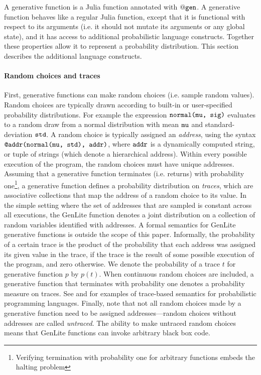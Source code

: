 A generative function is a Julia function annotated with $\mathtt{@gen}{}$.
A generative function behaves like a regular Julia function, except that it is functional with respect to its arguments (i.e. it should not mutate its arguments or any global state), and it has access to additional probabilistic language constructs.
Together these properties allow it to represent a probability distribution.
This section describes the additional language constructs.

\paragraph{Random choices and traces}
First, generative functions can make random choices (i.e. sample random values).
Random choices are typically drawn according to built-in or user-specified probability distributions.
For example the expression $\mbox{\texttt{normal(mu, sig)}}$ evaluates to a random draw from a normal distribution with mean $\mbox{\texttt{mu}}$ and standard-deviation $\mbox{\texttt{std}}$.
A random choice is typically assigned an \emph{address}, using the syntax $\mbox{\texttt{@addr(normal(mu, std), addr)}}$, where $\mbox{\texttt{addr}}$ is a dynamically computed string, or tuple of strings (which denote a hierarchical address).
Within every possible execution of the program, the random choices must have unique addresses.
Assuming that a generative function terminates (i.e. returns) with probability one\footnote{Verifying termination with probability one for arbitrary functions embeds the halting problem}, a generative function defines a probability distribution on \emph{traces}, which are associative collections that map the address of a random choice to its value.
In the simple setting where the set of addresses that are sampled is constant across all executions, the GenLite function denotes a joint distribution on a collection of random variables identified with addresses.
A formal semantics for GenLite generative functions is outside the scope of this paper.
Informally, the probability of a certain trace is the product of the probability that each address was assigned its given value in the trace, if the trace is the result of some possible execution of the program, and zero otherwise.
We denote the probability of a trace $t$ for generative function $p$ by $p(t)$.
When continuous random choices are included, a generative function that terminates with probability one denotes a probability measure on traces.
See \cite{CusumanoPLDI2018} and \cite{Borgstrom} for examples of trace-based semantics for probabilistic programming languages.
Finally, note that not all random choices made by a generative function need to be assigned addresses---random choices without addresses are called \emph{untraced}.
The ability to make untraced random choices means that GenLite functions can invoke arbitrary black box code.

